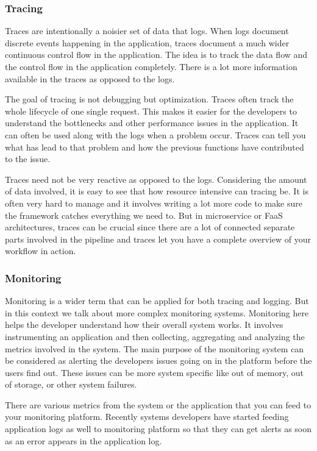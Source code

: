 \documentclass[12pt,titlepage]{article}
\begin{document}
\subsubsection{Tracing}
\label{sec:org6010627}
Traces are intentionally a noisier set of data that logs. When logs document
discrete events happening in the application, traces document a much wider
continuous control flow in the application. The idea is to track the data flow
and the control flow in the application completely. There is a lot more
information available in the traces as opposed to the logs.

The goal of tracing is not debugging but optimization. Traces often track the
whole lifecycle of one single request. This makes it easier for the developers
to understand the bottlenecks and other performance issues in the application.
It can often be used along with the logs when a problem occur. Traces can tell
you what has lead to that problem and how the previous functions have
contributed to the issue.

Traces need not be very reactive as opposed to the logs. Considering the amount
of data involved, it is easy to see that how resource intensive can tracing be.
It is often very hard to manage and it involves writing a lot more code to make
sure the framework catches everything we need to. But in microservice or FaaS
architectures, traces can be crucial since there are a lot of connected separate
parts involved in the pipeline and traces let you have a complete overview of
your workflow in action.

\subsubsection{Monitoring}
\label{sec:orge1f494e}
Monitoring is a wider term that can be applied for both tracing and logging. But
in this context we talk about more complex monitoring systems. Monitoring here
helps the developer understand how their overall system works. It involves
instrumenting an application and then collecting, aggregating and analyzing the
metrics involved in the system. The main purpose of the monitoring system can be
considered as alerting the developers issues going on in the platform before the
users find out. These issues can be more system specific like out of memory, out
of storage, or other system failures.

There are various metrics from the system or the application that you can feed
to your monitoring platform. Recently systems developers have started feeding
application logs as well to monitoring platform so that they can get alerts as
soon as an error appears in the application log.
\end{document}
